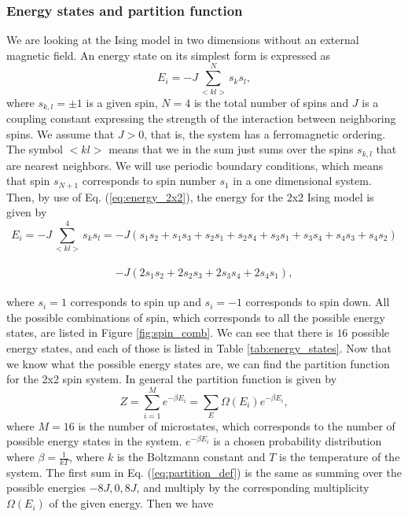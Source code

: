 \documentclass[12pt]{article}
\begin{document}
\begin{flushleft}
\subsubsection{Energy states and partition function}
We are looking at the Ising model in two dimensions without an external magnetic field. An energy state on its simplest form is expressed as
\begin{equation}\label{eq:energy_2x2}
E_i = -J\sum\limits_{<kl>}^{N}s_k s_l,
\end{equation}
where $s_{k,l} = \pm1$ is a given spin, $N=4$ is the total number of spins and $J$ is a coupling constant expressing the strength of the interaction between neighboring spins. We assume that $J>0$, that is, the system has a ferromagnetic ordering. The symbol $<kl>$ means that we in the sum just sums over the spins $s_{k,l}$ that are nearest neighbors. We will use periodic boundary conditions, which means that spin $s_{N+1}$ corresponds to spin number $s_1$ in a one dimensional system. Then, by use of Eq. (\ref{eq:energy_2x2}), the energy for the 2x2 Ising model is given by
\vspace{5mm}
$$E_i = -J\sum\limits_{<kl>}^{4}s_k s_l = -J\left(s_1s_2 + s_1s_3+s_2s_1+s_2s_4+s_3s_1+s_3s_4+s_4s_3+s_4s_2\right)$$\\
$$-J\left(2s_1s_2 + 2s_2s_3 + 2s_3s_4 + 2s_4s_1\right),$$\\
\vspace{5mm}
where $s_i = 1$ corresponds to spin up and $s_i = -1$ corresponds to spin down. All the possible combinations of spin, which corresponds to all the possible energy states, are listed in Figure \ref{fig:spin_comb}. We can see that there is $16$ possible energy states, and each of those is listed in Table \ref{tab:energy_states}. Now that we know what the possible energy states are, we can find the partition function for the 2x2 spin system. In general the partition function is given by\\
\vspace{5mm}
\begin{equation}\label{eq:partition_def}
Z = \sum\limits_{i=1}^{M}e^{-\beta E_i} = \sum\limits_E \Omega(E_i)e^{-\beta E_i},
\end{equation}
\vspace{5mm} 
\newpage
where $M = 16$ is the number of microstates, which corresponds to the number of possible energy states in the system. $e^{-\beta E_i}$ is a chosen probability distribution where $\beta = \frac{1}{kT}$, where $k$ is the Boltzmann constant and $T$ is the temperature of the system. The first sum in Eq. (\ref{eq:partition_def}) is the same as summing over the possible energies $-8J, 0, 8J$, and multiply by the corresponding multiplicity $\Omega(E_i)$ of the given energy. Then we have\\

\end{flushleft}
\end{document}
